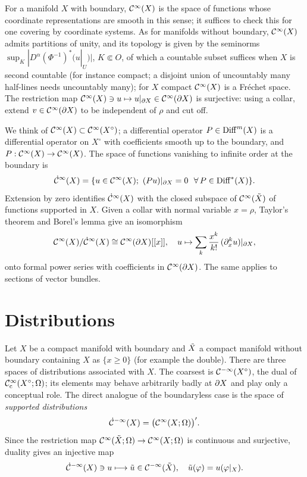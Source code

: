 For a manifold $X$ with boundary, $\mathcal{C}^\infty(X)$ is the space of functions whose
coordinate representations are smooth in this sense; it suffices to check this for
one covering by coordinate systems. As for manifolds without boundary, $\mathcal{C}^\infty(X)$ admits
partitions of unity, and its topology is given by the seminorms $\sup_K|D^\alpha
(\Phi^{-1})^*(u|_U)|$, $K\Subset O$, of which a countable subset suffices when $X$ is
second countable (for instance compact; a disjoint union of uncountably many half-lines
needs uncountably many); for $X$ compact $\mathcal{C}^\infty(X)$ is a Fr\'echet space. The restriction map $\mathcal{C}^\infty(X)\ni u\mapsto
u|_{\partial X}\in\mathcal{C}^\infty(\partial X)$ is surjective: using a collar, extend $v\in\mathcal{C}^\infty(\partial X)$ to be
independent of $\rho$ and cut off.

We think of $\mathcal{C}^\infty(X)\subset\mathcal{C}^\infty(X^\circ)$; a differential operator $P\in\operatorname{Diff}^{m}(X)$ is
a differential operator on $X^\circ$ with coefficients smooth up to the boundary, and
$P:\mathcal{C}^\infty(X)\to\mathcal{C}^\infty(X)$. The space of functions vanishing to infinite order at the
boundary is
\begin{equation*}
\dCI(X)=\{u\in\CI(X);\ (Pu)|_{\pa X}=0\ \ \forall\,P\in\Diff{*}(X)\}.
\end{equation*}
Extension by zero identifies $\dot{\mathcal{C}}^\infty(X)$ with the closed subspace of $\mathcal{C}^\infty(\tilde{X})$ of
functions supported in $X$. Given a collar with normal variable $x=\rho$, Taylor's
theorem and Borel's lemma give an isomorphism
\begin{equation*}
\mathcal{C}^\infty(X)/\dot{\mathcal{C}}^\infty(X)\cong\mathcal{C}^\infty(\partial X)[[x]],\quad u\mapsto\sum_k\frac{x^k}{k!}\,
(\partial_x^ku)|_{\partial X},
\end{equation*}
onto formal power series with coefficients in $\mathcal{C}^\infty(\partial X)$. The same applies to
sections of vector bundles.

\section{Distributions}\label{boundary:sec:distributions}

Let $X$ be a compact manifold with boundary and $\tilde{X}$ a compact manifold without
boundary containing $X$ as $\{x\ge0\}$ (for example the double). There are three
spaces of distributions associated with $X$. The coarsest is $\mathcal{C}^{-\infty}(X^\circ)$, the dual
of $\mathcal{C}^\infty_{\mathrm{c}}(X^\circ;\Omega)$; its elements may behave arbitrarily badly at $\partial X$ and
play only a conceptual role. The direct analogue of the boundaryless case is the space
of \emph{supported distributions}
\begin{equation*}
\dot{\mathcal{C}}^{-\infty}(X)=\big(\mathcal{C}^\infty(X;\Omega)\big)'.
\end{equation*}
Since the restriction map $\mathcal{C}^\infty(\tilde{X};\Omega)\to\mathcal{C}^\infty(X;\Omega)$ is continuous and
surjective, duality gives an injective map
\begin{equation}\label{boundary:eq:supp-incl}
\dot{\mathcal{C}}^{-\infty}(X)\ni u\longmapsto\tilde u\in\mathcal{C}^{-\infty}(\tilde{X}),\quad \tilde u(\varphi)=u(\varphi|_X).
\end{equation}

